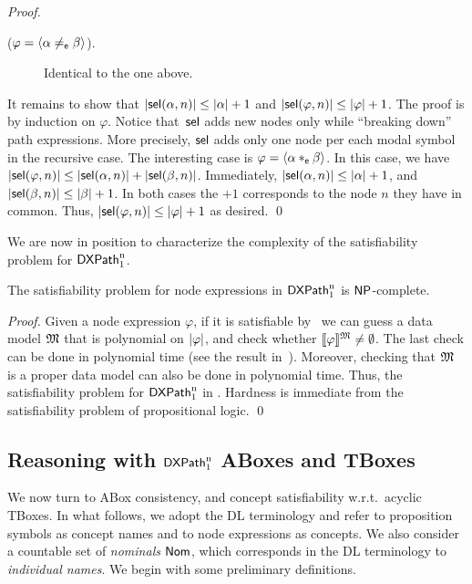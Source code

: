 \begin{proof}
\begin{description}
\begin{description}
            \item[($\varphi = \langle{\alpha\neq_{\mathsf{e}}\beta}\rangle$).]
            Identical to the one above.   
        \end{description}     
    \end{description}

    It remains to show that ${\mid}{\operatorname{\mathsf{sel}}(\alpha,n)}{\mid} \leq {\mid}{\alpha}{\mid} + 1$ and ${\mid}{\operatorname{\mathsf{sel}}(\varphi,n)}{\mid} \leq {\mid}{\varphi}{\mid} + 1$. The proof is by induction on $\varphi$.
    Notice that~$\operatorname{\mathsf{sel}}$ adds new nodes only while ``breaking down'' path expressions.
    More precisely, $\operatorname{\mathsf{sel}}$ adds only one node per each modal symbol in the recursive case.
    The interesting case is $\varphi = \langle{\alpha*_{\mathsf{e}}\beta}\rangle$.
    In this case, we have ${\mid}{\operatorname{\mathsf{sel}}(\varphi, n)}{\mid} \leq {\mid}{\operatorname{\mathsf{sel}}(\alpha, n)}{\mid} + {\mid}{\operatorname{\mathsf{sel}}(\beta, n)}{\mid}$.
    Immediately, ${\mid}{\operatorname{\mathsf{sel}}(\alpha, n)}{\mid} \leq {\mid}{\alpha}{\mid}+1$, and ${\mid}{\operatorname{\mathsf{sel}}(\beta, n)}{\mid} \leq {\mid}{\beta}{\mid}+1$.
    In both cases the $+1$ corresponds to the node $n$ they have in common.
    Thus, ${\mid}{\operatorname{\mathsf{sel}}(\varphi,n)}{\mid} \leq {\mid}{\varphi}{\mid}+1$ as desired.
    \qed
\end{proof}

We are now in position to characterize the complexity of the satisfiability problem for $\mathsf{DXPath}_{\rm 1}^{\rm n}$.

\begin{theorem}\label{theorem:xp-sat-np-complete}
    The satisfiability problem for node expressions in $\mathsf{DXPath}_{\rm 1}^{\rm n}$ is $\textsf{NP}$-complete.
\end{theorem}

\begin{proof}
    Given a node expression $\varphi$, if it is satisfiable by~ we can guess a data model $\mathfrak{M}$ that is polynomial on ${\mid}{\varphi}{\mid}$, and check whether $\llbracket{\varphi}\rrbracket^{\mathfrak{M}}\neq\emptyset$. The last check can be done in polynomial time (see the result in~\cite{ArecesF21}). Moreover, checking that $\mathfrak{M}$ is a proper data model can also be done in polynomial time. Thus, the satisfiability problem for $\mathsf{DXPath}_{\rm 1}^{\rm n}$ in \np.
    Hardness is immediate from the satisfiability problem of propositional logic.
    \qed
\end{proof}


\subsection{Reasoning with $\mathsf{DXPath}_{\rm 1}^{\rm n}$ ABoxes and TBoxes}
\label{subsec:xpath-f-kb}

We now turn to ABox consistency, and concept satisfiability w.r.t.\ acyclic TBoxes.
In what follows, we adopt the DL terminology and refer to proposition symbols as concept names and to node expressions as concepts. We also consider a countable set of \emph{nominals} $\mathsf{Nom}$, which corresponds in the DL terminology to \emph{individual names}. 
We begin with some preliminary definitions.

